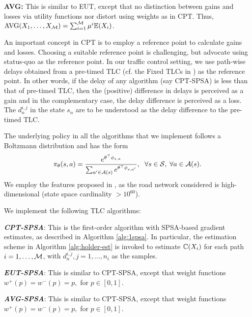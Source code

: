 \textbf{AVG:} This is similar to EUT, except that no distinction between gains and losses via utility functions nor distort using weights as in CPT. Thus, $\text{AVG}(X_1,\ldots,X_{\mathcal{M}}) = \sum_{i=1}^{\mathcal{M}} \mu^i \mathbb{E}(X_i)$. 

An important concept in CPT is to employ a reference point to calculate gains and losses. Choosing a suitable reference point is challenging, but \cite{tversky1992advances} advocate using status-quo as the reference point. In our traffic control setting, we use path-wise delays obtained from a pre-timed TLC (cf. the Fixed TLCs in \cite{prashanth2011reinforcement}) as the reference point. In other words, if the delay of any algorithm (say CPT-SPSA) is less than that of pre-timed TLC, then the (positive) difference in delays is perceived as a gain and in the complementary case, the delay difference is perceived as a loss. The $d_n^{i,j}$ in the state $s_n$ are to be understood as the delay difference to the pre-timed TLC.  

The underlying policy in all the algorithms that we implement follows a Boltzmann distribution and has the form
\begin{equation}
\pi_{\theta}(s,a) = \frac{e^{\theta^{\top} \phi_{s,a}}}{\sum_{a' \in {\mathcal{A}(s)}} e^{\theta^{\top} \phi_{s,a'}}},
\hspace{6pt} \forall s \in \mathcal{S},\;\forall a \in \mathcal{A}(s).
\label{eq:pi-boltzmann}
\end{equation}	
We employ the features proposed in \cite{prashanth2012threshold}, as the road network considered is high-dimensional (state space cardinality $> 10^{60}$). 

We implement the following TLC algorithms:

{\bf\em CPT-SPSA}: This is the first-order algorithm with SPSA-based gradient estimates, as described in Algorithm \ref{alg:1spsa}. In particular, the estimation scheme in Algorithm \ref{alg:holder-est} is invoked to estimate $\mathbb{C}(X_i)$ for each path $i=1,\ldots,\mathcal{M}$, with $d_n^{i,j}, j=1,\ldots,n_i$ as the samples.

{\bf\em EUT-SPSA}: This is similar to CPT-SPSA, except that weight functions $w^+(p)=w^-(p)=p,$ for $p\in [0,1]$. 

{\bf\em AVG-SPSA}: This is similar to CPT-SPSA, except that weight functions $w^+(p)=w^-(p)=p,$ for $p\in [0,1]$. 

